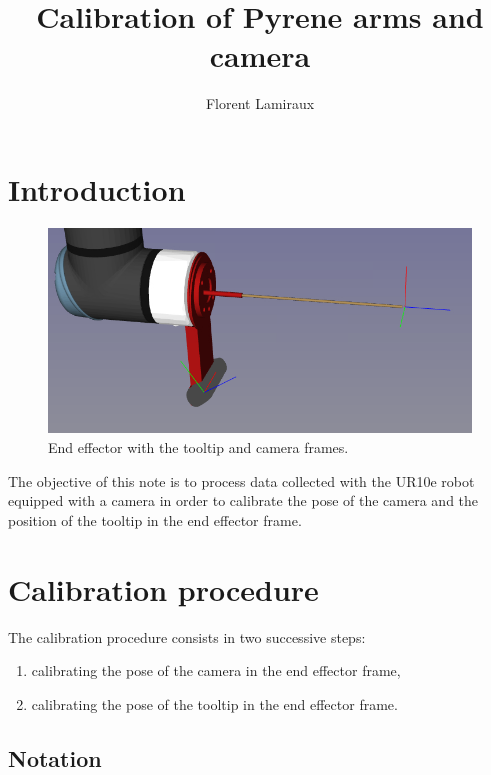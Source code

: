 \documentclass {article}
\title {Calibration of Pyrene arms and camera}
\author {Florent Lamiraux}
\date {}
\begin{document}
\maketitle
\section{Introduction}

\begin{figure}
  \centerline{
    \includegraphics[width=.7\linewidth]{end-effector.png}
  }
  \caption{End effector with the tooltip and camera frames.}
  \label{fig:end-effector}
\end{figure}

The objective of this note is to process data collected with the UR10e robot
equipped with a camera in order to calibrate the pose of the camera and the position of the tooltip in the end effector frame.

\section{Calibration procedure}

The calibration procedure consists in two successive steps:
\begin{enumerate}
\item calibrating the pose of the camera in the end effector frame,
\item calibrating the pose of the tooltip in the end effector frame.
\end{enumerate}

\subsection{Notation}
\end{document}
